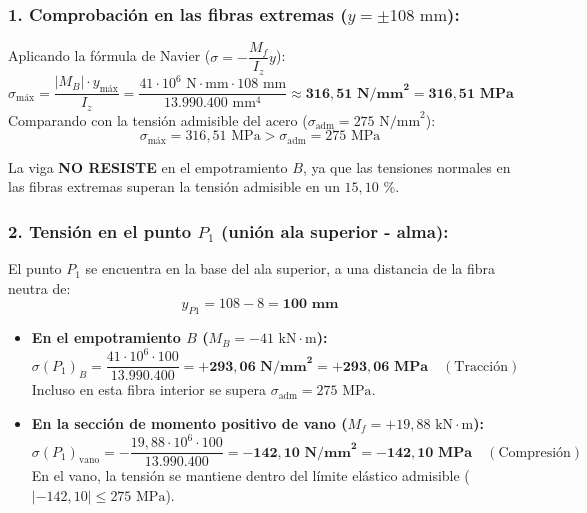 \subsubsection*{1. Comprobación en las fibras extremas ($y = \pm 108\text{ mm}$):}
Aplicando la fórmula de Navier ($\sigma = -\dfrac{M_f}{I_z}y$):
\begin{equation}
    \sigma_{\text{máx}} = \frac{|M_B| \cdot y_{\text{máx}}}{I_z} = \frac{41 \cdot 10^6\text{ N}\cdot\text{mm} \cdot 108\text{ mm}}{13.990.400\text{ mm}^4} \approx \mathbf{316{,}51\text{ N/mm}^2 = 316{,}51\text{ MPa}}
\end{equation}
Comparando con la tensión admisible del acero ($\sigma_{\text{adm}} = 275\text{ N/mm}^2$):
\begin{equation}
    \sigma_{\text{máx}} = 316{,}51\text{ MPa} > \sigma_{\text{adm}} = 275\text{ MPa}
\end{equation}
\begin{tcolorbox}[colback=red!10!white,colframe=red!80!black,title=\textbf{Dictamen Resistente en el Empotramiento}]
    La viga \textbf{NO RESISTE} en el empotramiento $B$, ya que las tensiones normales en las fibras extremas superan la tensión admisible en un $15{,}10\text{ \%}$.
\end{tcolorbox}

\subsubsection*{2. Tensión en el punto $P_1$ (unión ala superior - alma):}
El punto $P_1$ se encuentra en la base del ala superior, a una distancia de la fibra neutra de:
\begin{equation}
    y_{P1} = 108 - 8 = \mathbf{100\text{ mm}}
\end{equation}
\begin{itemize}
    \item \textbf{En el empotramiento $B$ ($M_B = -41\text{ kN}\cdot\text{m}$):}
          \begin{equation}
              \sigma(P_1)_B = \frac{41 \cdot 10^6 \cdot 100}{13.990.400} = \mathbf{+293{,}06\text{ N/mm}^2 = +293{,}06\text{ MPa}} \quad (\text{Tracción})
          \end{equation}
          Incluso en esta fibra interior se supera $\sigma_{\text{adm}} = 275\text{ MPa}$.
    \item \textbf{En la sección de momento positivo de vano ($M_{f} = +19{,}88\text{ kN}\cdot\text{m}$):}
          \begin{equation}
              \sigma(P_1)_{\text{vano}} = -\frac{19{,}88 \cdot 10^6 \cdot 100}{13.990.400} = \mathbf{-142{,}10\text{ N/mm}^2 = -142{,}10\text{ MPa}} \quad (\text{Compresión})
          \end{equation}
          En el vano, la tensión se mantiene dentro del límite elástico admisible ($|-142{,}10| \le 275\text{ MPa}$).
\end{itemize}

